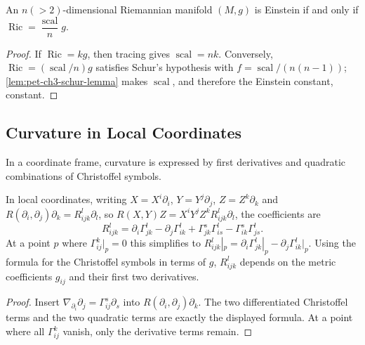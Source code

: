 \begin{corollary}
  \label{cor:pet-ch3-einstein-ricci-scalar-characterization}


  An $n(>2)$-dimensional Riemannian manifold $(M,g)$ is Einstein if and only if
  $\operatorname{Ric}=\dfrac{\operatorname{scal}}{n}g$.
\end{corollary}
\begin{proof}

  \sketch
  If $\operatorname{Ric}=kg$, then tracing gives
  $\operatorname{scal}=nk$. Conversely,
  $\operatorname{Ric}=(\operatorname{scal}/n)g$ satisfies Schur's hypothesis with
  $f=\operatorname{scal}/(n(n-1))$; \cref{lem:pet-ch3-schur-lemma} makes
  $\operatorname{scal}$, and therefore the Einstein constant, constant.
\end{proof}

\subsection{Curvature in Local Coordinates}

In a coordinate frame, curvature is expressed by first derivatives and
quadratic combinations of Christoffel symbols.

\begin{proposition}
  \label{prop:pet-ch3-curvature-coordinate-formula}


  In local coordinates, writing $X=X^i\partial_i$, $Y=Y^j\partial_j$,
  $Z=Z^k\partial_k$ and $R(\partial_i,\partial_j)\partial_k=R^l_{ijk}\partial_l$, so
  $R(X,Y)Z=X^iY^jZ^kR^l_{ijk}\partial_l$, the coefficients are
  \[
    R^l_{ijk}=\partial_i\Gamma^l_{jk}-\partial_j\Gamma^l_{ik}
    +\Gamma^s_{jk}\Gamma^l_{is}-\Gamma^s_{ik}\Gamma^l_{js}.
  \]
  At a point $p$ where $\Gamma^k_{ij}|_p=0$ this simplifies to
  $R^l_{ijk}|_p=\partial_i\Gamma^l_{jk}|_p-\partial_j\Gamma^l_{ik}|_p$. Using the
  formula for the Christoffel symbols in terms of $g$, $R^l_{ijk}$ depends on the
  metric coefficients $g_{ij}$ and their first two derivatives.
\end{proposition}
\begin{proof}

  \sketch
  Insert
  $\nabla_{\partial_i}\partial_j=\Gamma^s_{ij}\partial_s$ into
  $R(\partial_i,\partial_j)\partial_k$. The two differentiated Christoffel terms
  and the two quadratic terms are exactly the displayed formula. At a point
  where all $\Gamma^k_{ij}$ vanish, only the derivative terms remain.
\end{proof}

